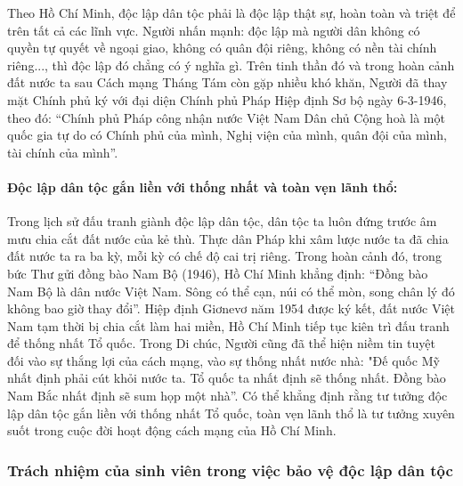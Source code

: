 Theo Hồ Chí Minh, độc lập dân tộc phải là độc lập thật sự, hoàn toàn và triệt để trên tất cả các lĩnh vực. Người nhấn mạnh: độc lập mà người dân không có quyền tự quyết về ngoại giao, không có quân đội riêng, không có nền tài chính riêng..., thì độc lập đó chẳng có ý nghĩa gì. Trên tinh thần đó và trong hoàn cảnh đất nước ta sau Cách mạng Tháng Tám còn gặp nhiều khó khăn, Người đã thay mặt Chính phủ ký với đại diện Chính phủ Pháp Hiệp định Sơ bộ ngày 6-3-1946, theo đó: ``Chính phủ Pháp công nhận nước Việt Nam Dân chủ Cộng hoà là một quốc gia tự do có Chính phủ của mình, Nghị viện của mình, quân đội của mình, tài chính của mình''.

\paragraph{Độc lập dân tộc gắn liền với thống nhất và toàn vẹn lãnh thổ:}
Trong lịch sử đấu tranh giành độc lập dân tộc, dân tộc ta luôn đứng trước âm mưu chia cắt đất nước của kẻ thù. Thực dân Pháp khi xâm lược nước ta đã chia đất nước ta ra ba kỳ, mỗi kỳ có chế độ cai trị riêng. Trong hoàn cảnh đó, trong bức Thư gửi đồng bào Nam Bộ (1946), Hồ Chí Minh khẳng định: ``Đồng bào Nam Bộ là dân nước Việt Nam. Sông có thể cạn, núi có thể mòn, song chân lý đó không bao giờ thay đổi''. Hiệp định Giơnevơ năm 1954 được ký kết, đất nước Việt Nam tạm thời bị chia cắt làm hai miền, Hồ Chí Minh tiếp tục kiên trì đấu tranh để thống nhất Tổ quốc. Trong Di chúc, Người cũng đã thể hiện niềm tin tuyệt đối vào sự thắng lợi của cách mạng, vào sự thống nhất nước nhà: "Đế quốc Mỹ nhất định phải cút khỏi nước ta. Tổ quốc ta nhất định sẽ thống nhất. Đồng bào Nam Bắc nhất định sẽ sum họp một nhà''. Có thể khẳng định rằng tư tưởng độc lập dân tộc gắn liền với thống nhất Tổ quốc, toàn vẹn lãnh thổ là tư tưởng xuyên suốt trong cuộc đời hoạt động cách mạng của Hồ Chí Minh.

\subsubsection{Trách nhiệm của sinh viên trong việc bảo vệ độc lập dân tộc}

